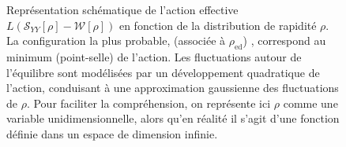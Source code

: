 \begin{figure}[H]
	\centering
	\caption{Représentation schématique de l’action effective $L(\mathcal{S}_{YY}[\rho] - \mathcal{W}[\rho])$ en fonction de la distribution de rapidité $\rho$. La configuration la plus probable, (associée à $\rho_{\mathrm{ed}}$) , correspond au minimum (point-selle) de l’action. Les fluctuations autour de l’équilibre sont modélisées par un développement quadratique de l’action, conduisant à une approximation gaussienne des fluctuations de $\rho$. Pour faciliter la compréhension, on représente ici $\rho$ comme une variable unidimensionnelle, alors qu’en réalité il s’agit d’une fonction définie dans un espace de dimension infinie.}
	\label{fig:Act.gauss}
\end{figure}


%						
%			
%			
%					
%
%						
%			
%			
%

